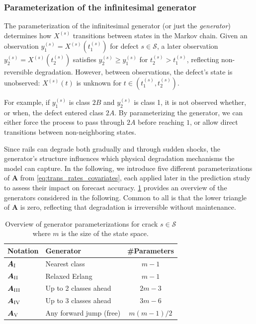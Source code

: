 \subsubsection{Parameterization of the infinitesimal generator} \label{sec:generator_params}
The parameterization of the infinitesimal generator (or just the \textit{generator}) determines how $X^{(s)}$ transitions between states in the Markov chain. 
Given an observation $y_1^{(s)} = X^{(s)}\left(t_1^{(s)}\right)$ for defect $s \in \mathcal{S}$, a later observation $y_2^{(s)} = X^{(s)}\left(t_2^{(s)}\right)$ satisfies $y_2^{(s)} \geq y_1^{(s)}$ for $t_2^{(s)} > t_1^{(s)}$, reflecting non-reversible degradation. However, between observations, the defect’s state is unobserved: $X^{(s)}(t)$ is unknown for $t \in \left(t_1^{(s)}, t_2^{(s)}\right)$.

For example, if $y_1^{(s)}$ is class $2B$ and $y_2^{(s)}$ is class 1, it is not observed whether, or when, the defect entered class $2A$. By parameterizing the generator, we can either force the process to pass through $2A$ before reaching $1$, or allow direct transitions between non-neighboring states. 

Since rails can degrade both gradually and through sudden shocks, the generator’s structure influences which physical degradation mechanisms the model can capture. In the following, we introduce five different parameterizations of $\bm{A}$ from \cref{eq:trans_rates_covariates}, each applied later in the prediction study to assess their impact on forecast accuracy. \cref{tab:generators_overview} provides an overview of the generators considered in the following. Common to all is that the lower triangle of $\bm{A}$ is zero, reflecting that degradation is irreversible without maintenance.

\begin{table}[htb!]
\centering
\caption{Overview of generator parameterizations for crack $s \in \mathcal{S}$ where $m$ is the size of the state space.}
\label{tab:generators_overview}
\begin{tabular}{@{}llc@{}}
\toprule
Notation & Generator & \#Parameters \\%
\midrule
$\bm{A}_{\RN{1}}$ & Nearest class & $m - 1$ \\%
$\bm{A}_{\RN{2}}$ & Relaxed Erlang & $m - 1$ \\%
$\bm{A}_{\RN{3}}$ & Up to 2 classes ahead & $2m - 3$ \\%
$\bm{A}_{\RN{4}}$ & Up to 3 classes ahead & $3m - 6$ \\%
$\bm{A}_{\RN{5}}$ & Any forward jump (free) & $m(m-1)/2$ \\%
\bottomrule
\end{tabular}
\end{table}

